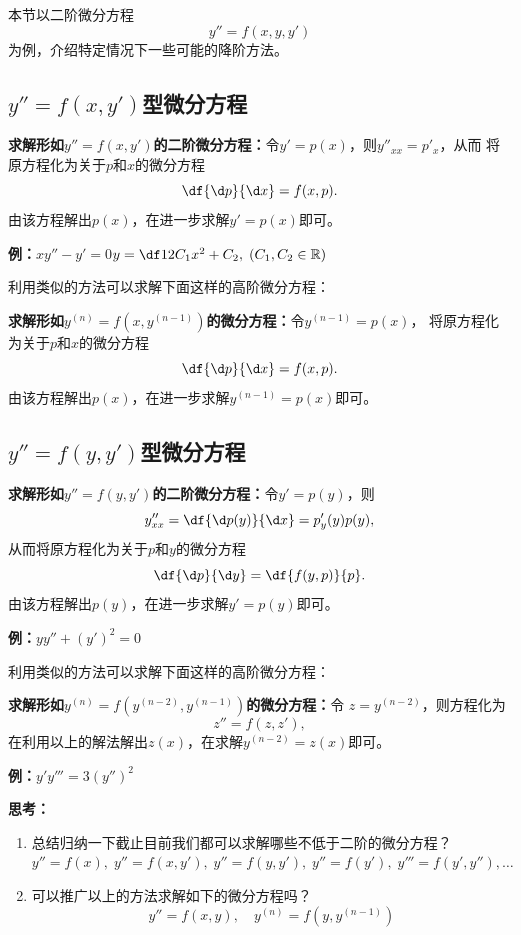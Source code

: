 本节以二阶微分方程
$$y''=f(x,y,y')$$
为例，介绍特定情况下一些可能的降阶方法。

\subsection{$y''=f(x,y')$型微分方程}

\begin{thx}
	{\bf 求解形如$y''=f(x,y')$的二阶微分方程：}令$y'=p(x)$，则$y''_{xx}=p'_x$，从而
	将原方程化为关于$p$和$x$的微分方程
	$$\df{\d p}{\d x}=f(x,p).$$
	由该方程解出$p(x)$，在进一步求解$y'=p(x)$即可。
\end{thx}

{\bf 例：}$xy''-y'=0$\hfill $y=\df12C_1x^2+C_2,\;(C_1,C_2\in\mathbb{R})$

利用类似的方法可以求解下面这样的高阶微分方程：

\begin{thx}
	{\bf 求解形如$y^{(n)}=f(x,y^{(n-1)})$的微分方程：}令$y^{(n-1)}=p(x)$，
	将原方程化为关于$p$和$x$的微分方程
	$$\df{\d p}{\d x}=f(x,p).$$
	由该方程解出$p(x)$，在进一步求解$y^{(n-1)}=p(x)$即可。
\end{thx}

\subsection{$y''=f(y,y')$型微分方程}

\begin{thx}
	{\bf 求解形如$y''=f(y,y')$的二阶微分方程：}令$y'=p(y)$，则
	$$y''_{xx}=\df{\d p(y)}{\d x}=p'_y(y)p(y),$$
	从而将原方程化为关于$p$和$y$的微分方程
	$$\df{\d p}{\d y}=\df{f(y,p)}{p}.$$
	由该方程解出$p(y)$，在进一步求解$y'=p(y)$即可。
\end{thx}

{\bf 例：}$yy''+(y')^2=0$

利用类似的方法可以求解下面这样的高阶微分方程：

\begin{thx}
	{\bf 求解形如$y^{(n)}=f(y^{(n-2)},y^{(n-1)})$的微分方程：}令
	$z=y^{(n-2)}$，则方程化为
	$$z''=f(z,z'),$$
	在利用以上的解法解出$z(x)$，在求解$y^{(n-2)}=z(x)$即可。
\end{thx}

{\bf 例：}$y'y'''=3(y'')^2$

{\bf 思考：}
\begin{enumerate}[(1)]
  \setlength{\itemindent}{1cm}
  \item 总结归纳一下截止目前我们都可以求解哪些不低于二阶的微分方程？\\
  $y''=f(x),\;y''=f(x,y'),\;y''=f(y,y'), \;y''=f(y'),\;y'''=f(y',y''),\ldots$
  \item 可以推广以上的方法求解如下的微分方程吗？
  $$y''=f(x,y),\quad y^{(n)}=f(y,y^{(n-1)})$$
\end{enumerate}

